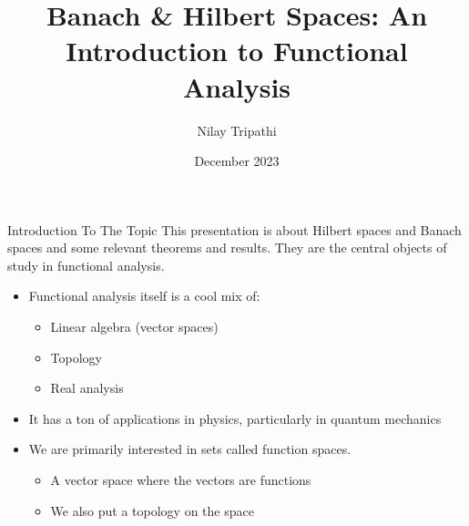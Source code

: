 \documentclass[10pt]{beamer}
\title{Banach \& Hilbert Spaces: An Introduction to Functional Analysis}
\subtitle{}
\author{Nilay Tripathi}
\date{December 2023}
\begin{document}
    \maketitle

    \begin{frame}{Introduction To The Topic}
        This presentation is about Hilbert spaces and Banach spaces and some relevant theorems and results. They are the central objects of study in \alert{functional analysis}. 
        \begin{itemize}
            \item Functional analysis itself is a cool mix of: 
            \begin{itemize}
                \item Linear algebra (vector spaces)
                \item Topology 
                \item Real analysis
            \end{itemize}
            \item It has a ton of applications in physics, particularly in quantum mechanics
            \item We are primarily interested in sets called \alert{function spaces}. 
            \begin{itemize}
                \item A vector space where the vectors are functions 
                \item We also put a topology on the space
            \end{itemize}
        \end{itemize}
    \end{frame}
\end{document}

